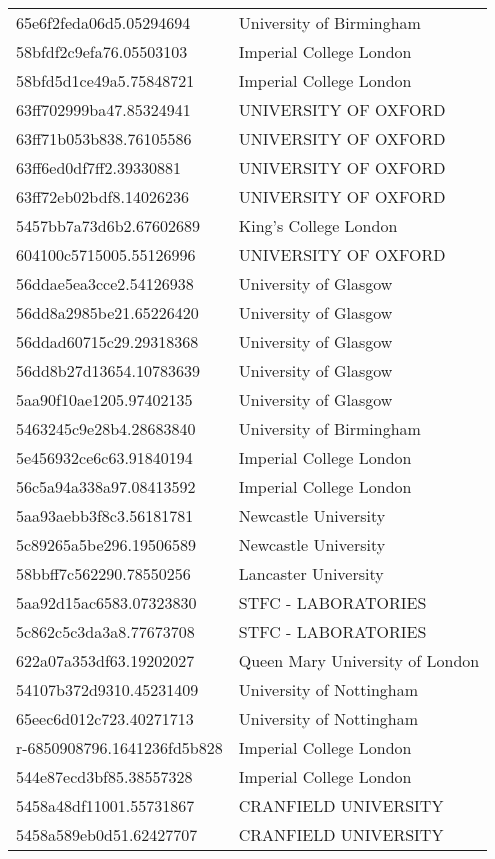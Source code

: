 \begin{tabular}{ll}
65e6f2feda06d5.05294694 & University of Birmingham \\
58bfdf2c9efa76.05503103 & Imperial College London \\
58bfd5d1ce49a5.75848721 & Imperial College London \\
63ff702999ba47.85324941 & UNIVERSITY OF OXFORD \\
63ff71b053b838.76105586 & UNIVERSITY OF OXFORD \\
63ff6ed0df7ff2.39330881 & UNIVERSITY OF OXFORD \\
63ff72eb02bdf8.14026236 & UNIVERSITY OF OXFORD \\
5457bb7a73d6b2.67602689 & King's College London \\
604100c5715005.55126996 & UNIVERSITY OF OXFORD \\
56ddae5ea3cce2.54126938 & University of Glasgow \\
56dd8a2985be21.65226420 & University of Glasgow \\
56ddad60715c29.29318368 & University of Glasgow \\
56dd8b27d13654.10783639 & University of Glasgow \\
5aa90f10ae1205.97402135 & University of Glasgow \\
5463245c9e28b4.28683840 & University of Birmingham \\
5e456932ce6c63.91840194 & Imperial College London \\
56c5a94a338a97.08413592 & Imperial College London \\
5aa93aebb3f8c3.56181781 & Newcastle University \\
5c89265a5be296.19506589 & Newcastle University \\
58bbff7c562290.78550256 & Lancaster University \\
5aa92d15ac6583.07323830 & STFC - LABORATORIES \\
5c862c5c3da3a8.77673708 & STFC - LABORATORIES \\
622a07a353df63.19202027 & Queen Mary University of London \\
54107b372d9310.45231409 & University of Nottingham \\
65eec6d012c723.40271713 & University of Nottingham \\
r-6850908796.1641236fd5b828 & Imperial College London \\
544e87ecd3bf85.38557328 & Imperial College London \\
5458a48df11001.55731867 & CRANFIELD UNIVERSITY \\
5458a589eb0d51.62427707 & CRANFIELD UNIVERSITY \\

\end{tabular}
